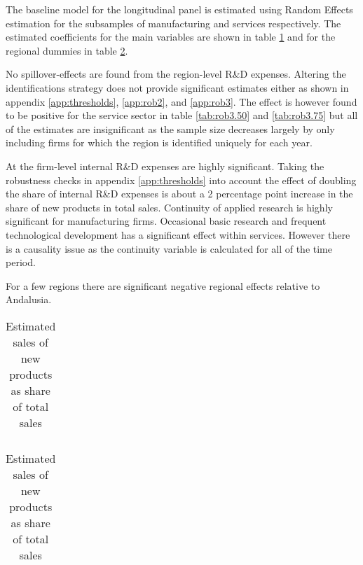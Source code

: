 \label{sec:results}
The baseline model for the longitudinal panel is estimated using Random Effects estimation for the subsamples of manufacturing and services respectively. The estimated coefficients for the main variables are shown in table \ref{tab:estimates} and for the regional dummies in table \ref{tab:regional}.

No spillover-effects are found from the region-level R\&D expenses. Altering the identifications strategy does not provide significant estimates either as shown in appendix \ref{app:thresholds}, \ref{app:rob2}, and \ref{app:rob3}. The effect is however found to be positive for the service sector in table \ref{tab:rob3.50} and \ref{tab:rob3.75} but all of the estimates are insignificant as the sample size decreases largely by only including firms for which the region is identified uniquely for each year.

At the firm-level internal R\&D expenses are highly significant. Taking the robustness checks in appendix \ref{app:thresholds} into account the effect of doubling the share of internal R\&D expenses is about a 2 percentage point increase in the share of new products in total sales. Continuity of applied research is highly significant for manufacturing firms. Occasional basic research and frequent technological development has a significant effect within services. However there is a causality issue as the continuity variable is calculated for all of the time period.

For a few regions there are significant negative regional effects relative to Andalusia.
\begin{table}[H]
  \vspace{-0.3cm}
  \centering
  \caption{Estimated sales of new products as share of total sales}
  \footnotesize
    \begin{tabular}{lcc}
    \toprule
        
    \end{tabular}
  \label{tab:estimates}
  \vspace{-0.3cm}
\end{table}
\begin{table}[H]
  \vspace{-.5cm}
  \centering
  \caption{Estimated sales of new products as share of total sales}
  \footnotesize
    \begin{tabular}{lcc}
    \toprule
        
    \end{tabular}
  \label{tab:regional}
\end{table}

\clearpage
